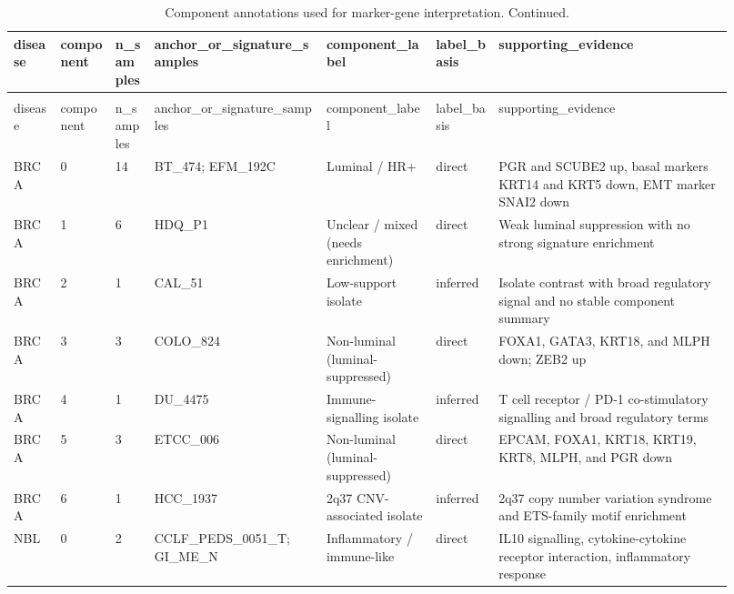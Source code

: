\begin{landscape}

{\scriptsize
\setlength{\tabcolsep}{3pt}
\begin{longtable}{p{0.06\linewidth}p{0.07\linewidth}p{0.05\linewidth}p{0.22\linewidth}p{0.14\linewidth}p{0.08\linewidth}p{0.30\linewidth}}
\caption{Component annotations used for marker-gene interpretation.}
\label{tab:supp_component_annotations}\\
\toprule
disease & component & n\_\allowbreak{}samples & anchor\_\allowbreak{}or\_\allowbreak{}signature\_\allowbreak{}samples & component\_\allowbreak{}label & label\_\allowbreak{}basis & supporting\_\allowbreak{}evidence \\
\midrule
\endfirsthead
\caption[]{Component annotations used for marker-gene interpretation. Continued.}\\
\toprule
disease & component & n\_\allowbreak{}samples & anchor\_\allowbreak{}or\_\allowbreak{}signature\_\allowbreak{}samples & component\_\allowbreak{}label & label\_\allowbreak{}basis & supporting\_\allowbreak{}evidence \\
\midrule
\endhead
\bottomrule
\endlastfoot
BRCA & 0 & 14 & BT\_\allowbreak{}474; EFM\_\allowbreak{}192C & Luminal / HR+ & direct & PGR and SCUBE2 up, basal markers KRT14 and KRT5 down, EMT marker SNAI2 down \\
BRCA & 1 & 6 & HDQ\_\allowbreak{}P1 & Unclear / mixed (needs enrichment) & direct & Weak luminal suppression with no strong signature enrichment \\
BRCA & 2 & 1 & CAL\_\allowbreak{}51 & Low-support isolate & inferred & Isolate contrast with broad regulatory signal and no stable component summary \\
BRCA & 3 & 3 & COLO\_\allowbreak{}824 & Non-luminal (luminal-suppressed) & direct & FOXA1, GATA3, KRT18, and MLPH down; ZEB2 up \\
BRCA & 4 & 1 & DU\_\allowbreak{}4475 & Immune-signalling isolate & inferred & T cell receptor / PD-1 co-stimulatory signalling and broad regulatory terms \\
BRCA & 5 & 3 & ETCC\_\allowbreak{}006 & Non-luminal (luminal-suppressed) & direct & EPCAM, FOXA1, KRT18, KRT19, KRT8, MLPH, and PGR down \\
BRCA & 6 & 1 & HCC\_\allowbreak{}1937 & 2q37 CNV-associated isolate & inferred & 2q37 copy number variation syndrome and ETS-family motif enrichment \\
NBL & 0 & 2 & CCLF\_\allowbreak{}PEDS\_\allowbreak{}0051\_\allowbreak{}T; GI\_\allowbreak{}ME\_\allowbreak{}N & Inflammatory / immune-like & direct & IL10 signalling, cytokine-cytokine receptor interaction, inflammatory response \\

\end{longtable}}
\end{landscape}
